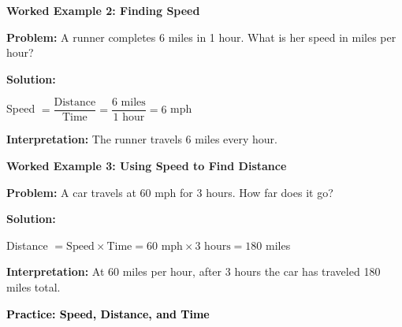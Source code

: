 \documentclass[12pt, letterpaper, fleqn]{article}
\begin{document}
\begin{tcolorbox}[colback=white, colframe=black, boxrule=0.6pt, arc=4mm, left=6mm, right=6mm, top=5mm, bottom=5mm]

\textbf{Worked Example 2: Finding Speed}

\medskip

\textbf{Problem:} A runner completes 6 miles in 1 hour. What is her speed in miles per hour?

\medskip

\noindent
\textbf{Solution:}

\medskip

\noindent
Speed $= \dfrac{\text{Distance}}{\text{Time}} = \dfrac{6 \text{ miles}}{1 \text{ hour}} = 6$ mph

\medskip

\noindent
\textbf{Interpretation:} The runner travels 6 miles every hour.

\end{tcolorbox}

\vspace{1mm}

\begin{tcolorbox}[colback=white, colframe=black, boxrule=0.6pt, arc=4mm, left=6mm, right=6mm, top=5mm, bottom=5mm]

\textbf{Worked Example 3: Using Speed to Find Distance}

\medskip

\textbf{Problem:} A car travels at 60 mph for 3 hours. How far does it go?

\medskip

\noindent
\textbf{Solution:}

\medskip

\noindent
Distance $= \text{Speed} \times \text{Time} = 60 \text{ mph} \times 3 \text{ hours} = 180$ miles

\medskip

\noindent
\textbf{Interpretation:} At 60 miles per hour, after 3 hours the car has traveled 180 miles total.

\end{tcolorbox}

\vspace{4mm}

\begin{tcolorbox}[colback=customteal!20]
\large\textcolor{black}{\textbf{Practice: Speed, Distance, and Time}}
\end{tcolorbox}
\end{document}
